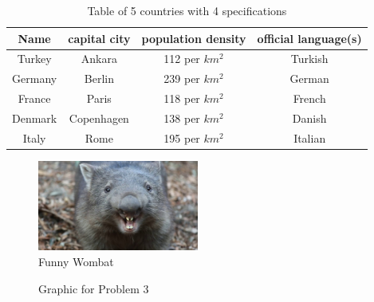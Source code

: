\documentclass[12pt]{scrartcl}
\begin{document}

\exercise{}
\begin{table}[!h]
    \centering
        \begin{tabular} {| c | c | c | c |}
            \hline Name & capital city & population density & official language(s)\\
            \hline Turkey & Ankara & 112 per $km^2$ & Turkish\\
            \hline Germany & Berlin & 239 per $km^2$ & German\\
            \hline France & Paris &  118 per $km^2$ & French\\
            \hline Denmark & Copenhagen & 138 per $km^2$ & Danish\\
            \hline Italy & Rome & 195 per $km^2$ & Italian\\
            \hline
        \end{tabular}
        \caption{Table of 5 countries with 4 specifications}
    \label{tab:CountryTable}
\end{table}

\exercise{}
    \begin{figure}[t]
        \centering
        \includegraphics[width=150pt]{wombat}
        \caption{Funny Wombat}
        \label{fig:Wombat}
    \end{figure}

\exercise{}
    \begin{figure}[!h]
        \centering
        \caption{Graphic for Problem 3}
        \label{fig:TikZ}
    \end{figure}
\end{document}
